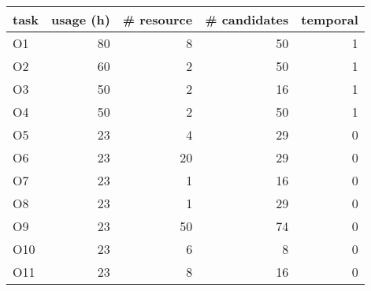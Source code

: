 \begin{tabular}{lrrrr}
\toprule
task &  usage (h) &  \# resource &  \# candidates &  temporal \\
\midrule
  O1 &         80 &           8 &            50 &         1 \\
  O2 &         60 &           2 &            50 &         1 \\
  O3 &         50 &           2 &            16 &         1 \\
  O4 &         50 &           2 &            50 &         1 \\
  O5 &         23 &           4 &            29 &         0 \\
  O6 &         23 &          20 &            29 &         0 \\
  O7 &         23 &           1 &            16 &         0 \\
  O8 &         23 &           1 &            29 &         0 \\
  O9 &         23 &          50 &            74 &         0 \\
 O10 &         23 &           6 &             8 &         0 \\
 O11 &         23 &           8 &            16 &         0 \\
\bottomrule
\end{tabular}
